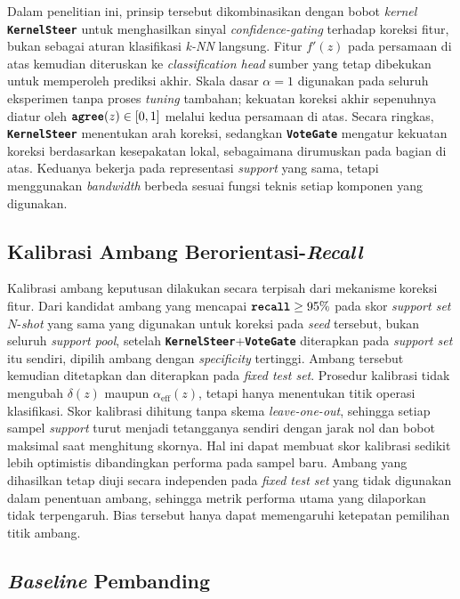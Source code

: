 \documentclass[conference]{IEEEtran}
\newcommand{\nama}[1]{\textbf{\texttt{#1}}}
\begin{document}
Dalam penelitian ini, prinsip tersebut dikombinasikan dengan bobot \textit{kernel} \nama{KernelSteer} untuk menghasilkan sinyal \textit{confidence-gating} terhadap koreksi fitur, bukan sebagai aturan klasifikasi \textit{k-NN} langsung. Fitur $f'(z)$ pada persamaan di atas kemudian diteruskan ke \textit{classification head} sumber yang tetap dibekukan untuk memperoleh prediksi akhir. Skala dasar $\alpha=1$ digunakan pada seluruh eksperimen tanpa proses \textit{tuning} tambahan; kekuatan koreksi akhir sepenuhnya diatur oleh $\nama{agree}(z)\in[0,1]$ melalui kedua persamaan di atas.
Secara ringkas, \nama{KernelSteer} menentukan arah koreksi, sedangkan \nama{VoteGate} mengatur kekuatan koreksi berdasarkan kesepakatan lokal, sebagaimana dirumuskan pada bagian di atas. Keduanya bekerja pada representasi \textit{support} yang sama, tetapi menggunakan
\textit{bandwidth} berbeda sesuai fungsi teknis setiap komponen yang digunakan.

\subsection{Kalibrasi Ambang Berorientasi-\textit{Recall}}
Kalibrasi ambang keputusan dilakukan secara terpisah dari mekanisme koreksi fitur. Dari kandidat ambang yang mencapai $\nama{recall}\geq 95\%$ pada skor \textit{support set} $N$-\textit{shot} yang sama yang digunakan untuk koreksi pada \textit{seed} tersebut, bukan seluruh \textit{support pool}, setelah \nama{KernelSteer}+\nama{VoteGate} diterapkan pada \textit{support set} itu sendiri, dipilih ambang dengan \textit{specificity} tertinggi. Ambang tersebut kemudian ditetapkan dan diterapkan pada \textit{fixed test set}. Prosedur kalibrasi tidak mengubah $\delta(z)$ maupun $\alpha_{\text{eff}}(z)$, tetapi hanya menentukan titik operasi klasifikasi. Skor kalibrasi dihitung tanpa skema \textit{leave-one-out}, sehingga setiap sampel \textit{support} turut menjadi tetangganya sendiri dengan jarak nol dan bobot maksimal saat menghitung skornya. Hal ini dapat membuat skor kalibrasi sedikit lebih optimistis dibandingkan performa pada sampel baru. Ambang yang dihasilkan tetap diuji secara independen pada \textit{fixed test set} yang tidak digunakan dalam penentuan ambang, sehingga metrik performa utama yang dilaporkan tidak terpengaruh. Bias tersebut hanya dapat memengaruhi ketepatan pemilihan titik ambang.

\subsection{\textit{Baseline} Pembanding}
\label{sec:baseline-pembanding}
\end{document}
